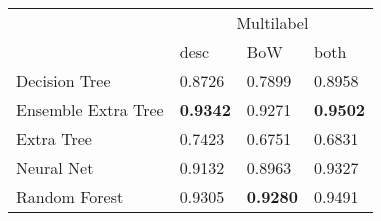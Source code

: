 \begin{tabular}{|l|l|l|l| }
\hline
 &  \multicolumn{3}{c|}{Multilabel} \\
\cline{2-4} & desc & BoW & both \\ \hline
Decision Tree       & 0.8726 & 0.7899 & 0.8958\\
Ensemble Extra Tree & {\bf 0.9342} & 0.9271 & {\bf 0.9502}\\
Extra Tree          & 0.7423 & 0.6751 & 0.6831\\
Neural Net          & 0.9132 & 0.8963 & 0.9327\\
Random Forest       & 0.9305 & {\bf 0.9280} & 0.9491\\
\hline
\end{tabular}
